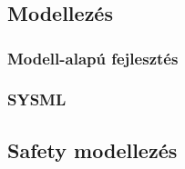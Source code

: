 \chapter{\hatterismeret}

\section{Modellezés}
\subsection{Modell-alapú fejlesztés}

\subsection{SYSML}

\section{Safety modellezés}
